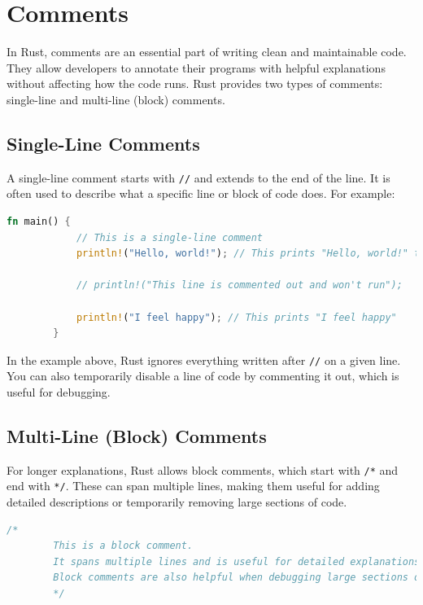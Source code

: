 \documentclass[a4paper,12pt]{report}
\begin{document}
	\section{Comments}
	
	
	In Rust, comments are an essential part of writing clean and maintainable code. They allow developers to annotate their programs with helpful explanations without affecting how the code runs. Rust provides two types of comments: single-line and multi-line (block) comments.
	
	\subsection*{Single-Line Comments}
	
	A single-line comment starts with \texttt{//} and extends to the end of the line. It is often used to describe what a specific line or block of code does. For example:
	
	\begin{lstlisting}[language=Rust]
		fn main() {
			// This is a single-line comment
			println!("Hello, world!"); // This prints "Hello, world!" to the console
			
			// println!("This line is commented out and won't run");
			
			println!("I feel happy"); // This prints "I feel happy"
		}
	\end{lstlisting}
	
		\noindent In the example above, Rust ignores everything written after \texttt{//} on a given line. You can also temporarily disable a line of code by commenting it out, which is useful for debugging.
	
	\subsection*{Multi-Line (Block) Comments}
	
	For longer explanations, Rust allows block comments, which start with \texttt{/*} and end with \texttt{*/}. These can span multiple lines, making them useful for adding detailed descriptions or temporarily removing large sections of code.
	
	\begin{lstlisting}[language=Rust]
		/*
		This is a block comment.
		It spans multiple lines and is useful for detailed explanations.
		Block comments are also helpful when debugging large sections of code.
		*/
	\end{lstlisting}
	
\end{document}
